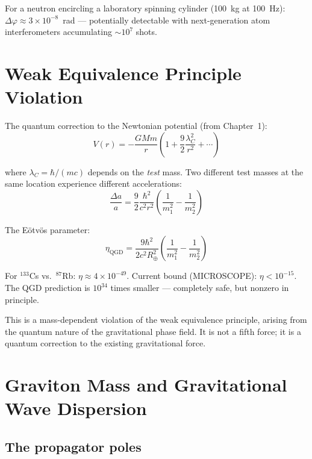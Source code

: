 \documentclass[11pt,a4paper]{article}
\theoremstyle{plain}
\theoremstyle{definition}
\theoremstyle{remark}
\begin{document}
For a neutron encircling a laboratory spinning cylinder (100~kg at 100~Hz): $\Delta\varphi \approx 3\times10^{-8}$~rad --- potentially detectable with next-generation atom interferometers accumulating $\sim10^7$ shots.

\section{Weak Equivalence Principle Violation}
\label{sec:wep}

The quantum correction to the Newtonian potential (from Chapter~1):
\begin{equation}
  V(r) = -\frac{GMm}{r}\left(1 + \frac{9}{2}\frac{\lambda_C^2}{r^2} + \cdots\right)
\end{equation}

where $\lambda_C = \hbar/(mc)$ depends on the \emph{test} mass.  Two different test masses at the same location experience different accelerations:
\begin{equation}
  \frac{\Delta a}{a} = \frac{9}{2}\frac{\hbar^2}{c^2 r^2}\left(\frac{1}{m_1^2} - \frac{1}{m_2^2}\right)
\end{equation}

The E\"otv\"os parameter:
\begin{equation}
  \eta_{\mathrm{QGD}} = \frac{9\hbar^2}{2c^2 R_\oplus^2}\left(\frac{1}{m_1^2} - \frac{1}{m_2^2}\right)
\end{equation}

For $^{133}$Cs vs.\ $^{87}$Rb: $\eta \approx 4\times10^{-49}$.  Current bound (MICROSCOPE): $\eta < 10^{-15}$.  The QGD prediction is $10^{34}$ times smaller --- completely safe, but nonzero in principle.

This is a mass-dependent violation of the weak equivalence principle, arising from the quantum nature of the gravitational phase field.  It is not a fifth force; it is a quantum correction to the existing gravitational force.

\section{Graviton Mass and Gravitational Wave Dispersion}
\label{sec:graviton_mass}

\subsection{The propagator poles}
\end{document}

